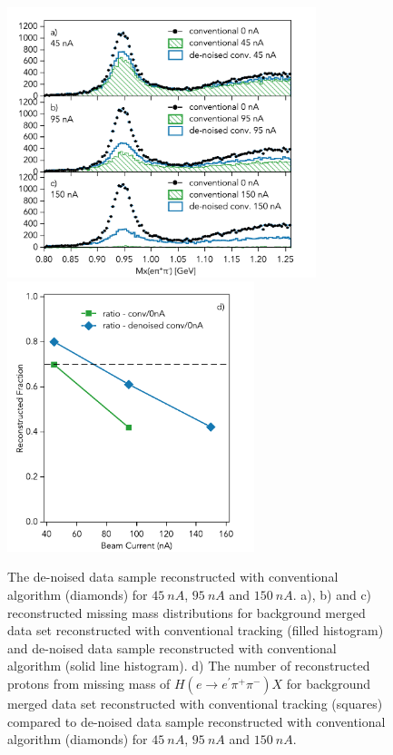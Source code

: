 \begin{figure}[!h]
\begin{center}
 \includegraphics[height=3.1in]{images/plots_mxepipi_dn_ns.pdf}
   \includegraphics[height=3.1in]{images/graph_mxepipi_dn_ns.pdf}
\caption {
The de-noised data sample 
reconstructed with conventional algorithm (diamonds) for $45~nA$, $95~nA$ and $150~nA$. a), b) and c) reconstructed 
missing mass distributions for background merged data set reconstructed with conventional tracking (filled histogram) and
de-noised data sample reconstructed with conventional algorithm (solid line histogram).
d) The number of reconstructed protons from missing mass of $H(e \rightarrow e^\prime \pi^+\pi^-)X$ 
for background merged data set reconstructed with conventional tracking (squares) compared to de-noised data sample 
reconstructed with conventional algorithm (diamonds) for $45~nA$, $95~nA$ and $150~nA$.  }
 \label{physics::conv_dn}
 \end{center}
\end{figure}

